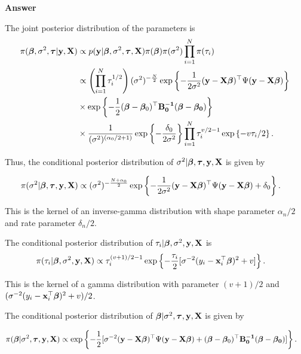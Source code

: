 \begin{enumerate}[leftmargin=*]
\textbf{Answer}

The joint posterior distribution of the parameters is
\begin{align*}
	\pi(\bm{\beta}, \sigma^2, \bm{\tau}|\bf{y}, {\bf{X}}) & \propto p({\bf{y}}|\bm{\beta}, \sigma^2, \bm{\tau}, {\bf{X}}) \pi(\bm{\beta}) \pi(\sigma^2) \prod_{i=1}^N \pi(\tau_i) \\
	&\propto \left(\prod_{i=1}^N \tau_i^{1/2}\right)(\sigma^2)^{-\frac{N}{2}}\exp\left\{-\frac{1}{2\sigma^2}({\bf{y}}-{\bf{X}}\bm{\beta})^{\top}\Psi({\bf{y}}-{\bf{X}}\bm{\beta})\right\}\\
	&\times \exp\left\{-\frac{1}{2}(\bm{\beta} - \bm{\beta}_0)^{\top}\bf{B}_0^{-1}(\bm{\beta} - \bm{\beta}_0)\right\}\\
	&\times\frac{1}{(\sigma^2)^{(\alpha_0/2+1)}}\exp\left\{-\frac{\delta_0}{2\sigma^2}\right\}\prod_{i=1}^N \tau_i^{v/2-1}\exp\left\{-v\tau_i/2\right\}.
\end{align*}

Thus, the conditional posterior distribution of $\sigma^2|\bm{\beta}, \bm{\tau}, \bf{y}, {\bf{X}}$ is given by

\begin{align*}
	\pi(\sigma^2|\bm{\beta}, \bm{\tau}, \bf{y}, {\bf{X}}) & \propto (\sigma^2)^{-\frac{N+\alpha_0}{2}}\exp\left\{-\frac{1}{2\sigma^2}({\bf{y}}-{\bf{X}}\bm{\beta})^{\top}\Psi({\bf{y}}-{\bf{X}}\bm{\beta})+\delta_0\right\}.
\end{align*}

This is the kernel of an inverse-gamma distribution with shape parameter $\alpha_n/2$ and rate parameter $\delta_n/2$.

The conditional posterior distribution of $\tau_i|\bm{\beta}, \sigma^2, \bf{y}, {\bf{X}}$ is
\begin{align*}
	\pi(\tau_i|\bm{\beta}, \sigma^2,\bf{y}, {\bf{X}}) & \propto
	\tau_i^{(v+1)/2-1}\exp\left\{-\frac{\tau_i}{2}[\sigma^{-2}(y_i-{\bf{x}}_i^{\top}\bm{\beta})^2+v]\right\}.
\end{align*}

This is the kernel of a gamma distribution with parameter $(v+1)/2$ and $(\sigma^{-2}(y_i-{\bf{x}}_i^{\top}\bm{\beta})^2+v)/2$. 

The conditional posterior distribution of $\bm{\beta}|\sigma^2, \bm{\tau}, \bf{y}, {\bf{X}}$ is given by

\begin{align*}
	\pi(\bm{\beta}| \sigma^2, \bm{\tau}, \bf{y}, {\bf{X}}) & \propto \exp\left\{-\frac{1}{2}[\sigma^{-2}({\bf{y}}-{\bf{X}}\bm{\beta})^{\top}\Psi({\bf{y}}-{\bf{X}}\bm{\beta})+(\bm{\beta} - \bm{\beta}_0)^{\top}\bf{B}_0^{-1}(\bm{\beta} - \bm{\beta}_0)]\right\}.
\end{align*} 


\end{enumerate}
